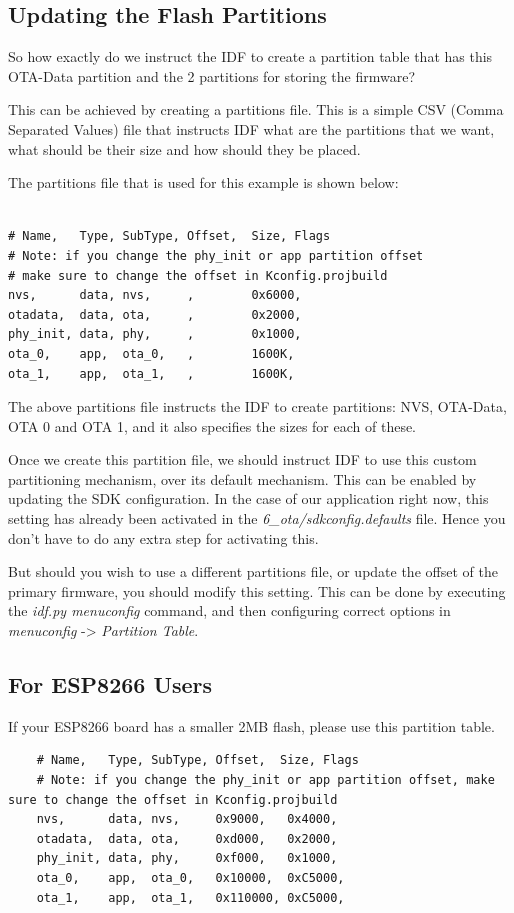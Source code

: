 \documentclass[main.tex]{subfiles}
\begin{document}
\subsection{Updating the Flash Partitions}\label{sec:updating_flash_partitions}
So how exactly do we instruct the IDF to create a partition table that has this OTA-Data partition and the 2 partitions for storing the firmware?

This can be achieved by creating a partitions file. This is a simple CSV (Comma Separated Values) file that instructs IDF what are the partitions that we want, what should be their size and how should they be placed.

The partitions file that is used for this example is shown below:
\begin{verbatim}

# Name,   Type, SubType, Offset,  Size, Flags
# Note: if you change the phy_init or app partition offset
# make sure to change the offset in Kconfig.projbuild
nvs,      data, nvs,     ,        0x6000,
otadata,  data, ota,     ,        0x2000,
phy_init, data, phy,     ,        0x1000,
ota_0,    app,  ota_0,   ,        1600K,
ota_1,    app,  ota_1,   ,        1600K,
\end{verbatim}

The above partitions file instructs the IDF to create partitions: NVS, OTA-Data, OTA 0 and OTA 1, and it also specifies the sizes for each of these.

Once we create this partition file, we should instruct IDF to use this custom partitioning mechanism, over its default mechanism. This can be enabled by updating the SDK configuration. In the case of our application right now, this setting has already been activated in the \textit{6\_ota/sdkconfig.defaults} file. Hence you don't have to do any extra step for activating this.

But should you wish to use a different partitions file, or update the offset of the primary firmware, you should modify this setting. This can be done by executing the \textit{idf.py menuconfig} command, and then configuring correct options in \textit{menuconfig} -> \textit{Partition Table}.

\subsection{For ESP8266 Users}\label{sec:for_esp8266_users}
If your ESP8266 board has a smaller 2MB flash, please use this partition table.
\begin{verbatim}
    # Name,   Type, SubType, Offset,  Size, Flags
    # Note: if you change the phy_init or app partition offset, make sure to change the offset in Kconfig.projbuild
    nvs,      data, nvs,     0x9000,   0x4000,
    otadata,  data, ota,     0xd000,   0x2000,
    phy_init, data, phy,     0xf000,   0x1000,
    ota_0,    app,  ota_0,   0x10000,  0xC5000,
    ota_1,    app,  ota_1,   0x110000, 0xC5000,
\end{verbatim}
\end{document}
